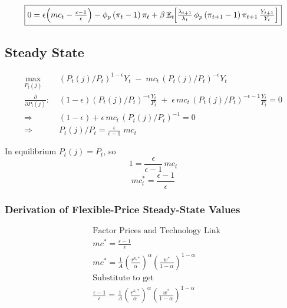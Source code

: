 \documentclass[11pt,preprint]{elsarticle}
\numberwithin{equation}{section}
\numberwithin{figure}{section}
\numberwithin{table}{section}
\begin{document}
\begin{equation}\label{rotemberg_FOC}
\boxed{
  0 = \epsilon\Bigl(mc_t - \tfrac{\epsilon-1}{\epsilon}\Bigr)
      - \phi_p\,(\pi_t - 1)\,\pi_t
      + \beta\,\mathbb{E}_t\!
        \Bigl[
          \tfrac{\lambda_{t+1}}{\lambda_t}\,
          \phi_p\,(\pi_{t+1}-1)\,\pi_{t+1}\,
          \tfrac{Y_{t+1}}{Y_t}
        \Bigr]
}
\end{equation}

\subsection{\texorpdfstring{Steady State
\label{steady_state_app}}{Steady State }}\label{steady-state-1}

\begin{align*}
\max_{P_t(j)}\;&(P_t(j)/P_t)^{1-\epsilon}Y_t \;-\; mc_t\,(P_t(j)/P_t)^{-\epsilon}Y_t \\[6pt]
\frac{\partial}{\partial P_t(j)}:\;&(1-\epsilon)(P_t(j)/P_t)^{-\epsilon}\frac{Y_t}{P_t}
\;+\;\epsilon\,mc_t\,(P_t(j)/P_t)^{-\epsilon-1}\frac{Y_t}{P_t}=0 \\[6pt]
\Rightarrow\;&(1-\epsilon)+\epsilon\,mc_t\,(P_t(j)/P_t)^{-1}=0 \\[4pt]
\Rightarrow\;&P_t(j)/P_t=\frac{\epsilon}{\epsilon-1}\;mc_t
\end{align*}

In equilibrium \(P_t(j)=P_t\), so \[
1=\frac{\epsilon}{\epsilon-1}\,mc_t
\] \begin{equation}\label{eq:mc}
mc^*_t=\frac{\epsilon-1}{\epsilon}
\end{equation}

\subsubsection{Derivation of Flexible-Price Steady-State
Values}\label{derivation-of-flexible-price-steady-state-values}

\begin{align*}
& \text{Factor Prices and Technology Link} \\
& mc^* = \frac{\epsilon - 1}{\epsilon} \\
& mc^* = \frac{1}{A} \left( \frac{r^{k,*}}{\alpha} \right)^{\alpha}
            \left( \frac{w^*}{1-\alpha} \right)^{1-\alpha} \\
& \text{Substitute to get} \\
& \frac{\epsilon - 1}{\epsilon}
  = \frac{1}{A} \left( \frac{r^{k,*}}{\alpha} \right)^{\alpha}
    \left( \frac{w^*}{1-\alpha} \right)^{1-\alpha}
\end{align*}
\end{document}
